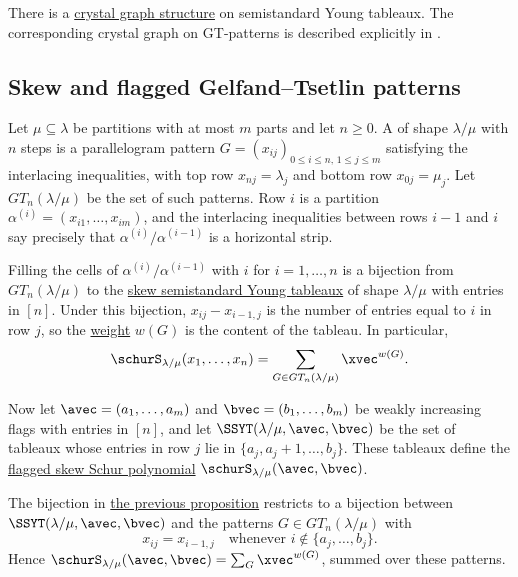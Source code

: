 There is a \hyperref[crystalGraphs]{crystal graph structure} on semistandard
Young tableaux.
The corresponding crystal graph on GT-patterns is described explicitly in
\cite{HartwigKingston2026}.


\subsection[skewFlaggedGTPatterns]{Skew and flagged Gelfand--Tsetlin patterns}

Let $\mu \subseteq \lambda$ be partitions with at most $m$ parts and let
$n \geq 0$.
A \label{skewGTPattern} of shape
$\lambda/\mu$ with $n$ steps is a parallelogram pattern
$G=(x_{ij})_{0 \leq i \leq n,\, 1 \leq j \leq m}$ satisfying the interlacing
inequalities, with top row $x_{nj}=\lambda_j$ and bottom row $x_{0j}=\mu_j$.
Let $GT_n(\lambda/\mu)$ be the set of such patterns.
Row $i$ is a partition $\alpha^{(i)}=(x_{i1},\dotsc,x_{im})$, and the
interlacing inequalities between rows $i-1$ and $i$ say precisely that
$\alpha^{(i)}/\alpha^{(i-1)}$ is a horizontal strip.

\begin{proposition}\label{skewGTBijection}
Filling the cells of $\alpha^{(i)}/\alpha^{(i-1)}$ with $i$ for
$i=1,\dotsc,n$ is a bijection from $GT_n(\lambda/\mu)$ to the
\hyperref[skewShapes]{skew semistandard Young tableaux} of shape $\lambda/\mu$
with entries in $[n]$.
Under this bijection, $x_{ij}-x_{i-1,j}$ is the number of entries equal to $i$
in row $j$, so the \hyperref[gtPatternWeight]{weight} $w(G)$ is the content of
the tableau.  In particular,
\[
\schurS_{\lambda/\mu}(x_1,\dotsc,x_n) = \sum_{G \in GT_n(\lambda/\mu)} \xvec^{w(G)}.
\]
\end{proposition}

Now let $\avec=(a_1,\dotsc,a_m)$ and $\bvec=(b_1,\dotsc,b_m)$ be weakly
increasing flags with entries in $[n]$, and let $\SSYT(\lambda/\mu,\avec,\bvec)$
be the set of tableaux whose entries in row $j$ lie in
$\{a_j,a_j+1,\dotsc,b_j\}$.  These tableaux define the
\hyperref[flaggedSkewSchurPolynomialDefinition]{flagged skew Schur polynomial}
$\schurS_{\lambda/\mu}(\avec,\bvec)$.

\begin{proposition}
\label{flaggedGTBijection}
The bijection in \hyperref[skewGTBijection]{the previous proposition}
restricts to a bijection between $\SSYT(\lambda/\mu,\avec,\bvec)$ and the
patterns $G \in GT_n(\lambda/\mu)$ with
\[
x_{ij} = x_{i-1,j} \quad \text{whenever } i \notin \{a_j,\dotsc,b_j\}.
\]
Hence $\schurS_{\lambda/\mu}(\avec,\bvec)=\sum_G \xvec^{w(G)}$, summed over
these patterns.
\end{proposition}

